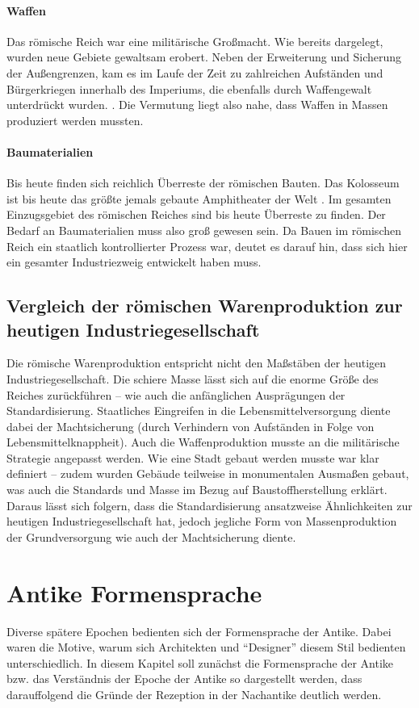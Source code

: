 \documentclass[
    a4paper,
    11pt,
    bibliography=totoc,
    listof=totoc,
    parskip=half,
    headings=normal
]{scrbook}
\begin{document}
\subsubsection{Waffen}
Das römische Reich war eine militärische Großmacht. Wie bereits dargelegt, wurden neue Gebiete gewaltsam erobert. Neben der Erweiterung und Sicherung der Außengrenzen, kam es im Laufe der Zeit zu zahlreichen Aufständen und Bürgerkriegen innerhalb des Imperiums, die ebenfalls durch Waffengewalt unterdrückt wurden. \autocite{ListRomanCivil2025}. Die Vermutung liegt also nahe, dass Waffen in Massen produziert werden mussten.

\subsubsection{Baumaterialien}
Bis heute finden sich reichlich Überreste der römischen Bauten. Das Kolosseum ist bis heute das größte jemals gebaute Amphitheater der Welt \autocite{Colosseum}. Im gesamten Einzugsgebiet des römischen Reiches sind bis heute Überreste zu finden. Der Bedarf an Baumaterialien muss also groß gewesen sein. Da Bauen im römischen Reich ein staatlich kontrollierter Prozess war, deutet es darauf hin, dass sich hier ein gesamter Industriezweig entwickelt haben muss.

\section{Vergleich der römischen Warenproduktion zur heutigen Industriegesellschaft}
Die römische Warenproduktion entspricht nicht den Maßstäben der heutigen Industriegesellschaft. Die schiere Masse lässt sich auf die enorme Größe des Reiches zurückführen -- wie auch die anfänglichen Ausprägungen der Standardisierung. Staatliches Eingreifen in die Lebensmittelversorgung diente dabei der Machtsicherung (durch Verhindern von Aufständen in Folge von Lebensmittelknappheit). Auch die Waffenproduktion musste an die militärische Strategie angepasst werden. Wie eine Stadt gebaut werden musste war klar definiert -- zudem wurden Gebäude teilweise in monumentalen Ausmaßen gebaut, was auch die Standards und Masse im Bezug auf Baustoffherstellung erklärt. Daraus lässt sich folgern, dass die Standardisierung ansatzweise Ähnlichkeiten zur heutigen Industriegesellschaft hat, jedoch jegliche Form von Massenproduktion der Grundversorgung wie auch der Machtsicherung diente.

\chapter{Antike Formensprache}
Diverse spätere Epochen bedienten sich der Formensprache der Antike. Dabei waren die Motive, warum sich Architekten und \enquote{Designer} diesem Stil bedienten unterschiedlich. In diesem Kapitel soll zunächst die Formensprache der Antike bzw. das Verständnis der Epoche der Antike so dargestellt werden, dass darauffolgend die Gründe der Rezeption in der Nachantike deutlich werden.
\end{document}
